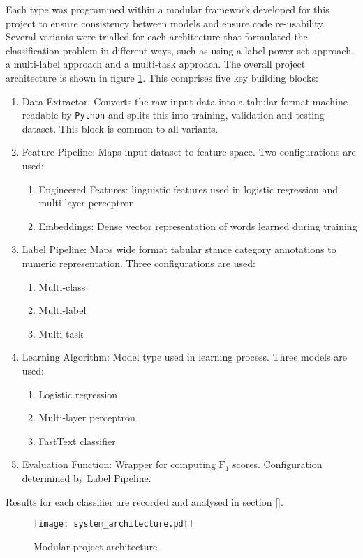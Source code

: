 \documentclass[Dissertation.tex]{subfiles}
\begin{document}
Each type was programmed within a modular framework developed for this project to ensure consistency between models and ensure code re-usability. 
Several variants were trialled for each architecture that formulated the classification problem in different ways, such as using a label power set approach, a multi-label approach and a multi-task approach. The overall project architecture is shown in figure \ref{fig:modularProject}. This comprises five key building blocks:
\begin{enumerate}
	\item Data Extractor: Converts the raw input data into a tabular format machine readable by \texttt{Python} and splits this into training, validation and testing dataset. This block is common to all variants.
	\item Feature Pipeline: Maps input dataset to feature space. Two configurations are used:
	\begin{enumerate}
		\item Engineered Features: linguistic features used in logistic regression and multi layer perceptron
		\item Embeddings: Dense vector representation of words learned during training
	\end{enumerate} 
	\item Label Pipeline: Maps wide format tabular stance category annotations to numeric representation. Three configurations are used:
		\begin{enumerate}
			\item Multi-class
			\item Multi-label
			\item Multi-task 
		\end{enumerate}	
	\item Learning Algorithm: Model type used in learning process. Three models are used:
		\begin{enumerate}
			\item Logistic regression
			\item Multi-layer perceptron
			\item FastText classifier
		\end{enumerate}
	\item Evaluation Function: Wrapper for computing $ \mathrm{F_1} $ scores. Configuration determined by Label Pipeline.
\end{enumerate}

Results for each classifier are recorded and analysed in section \ref{}.

\begin{figure}
	\centering
	\texttt{[image: system\_architecture.pdf]}
	\caption{Modular project architecture}
	\label{fig:modularProject}
\end{figure}
\end{document}
